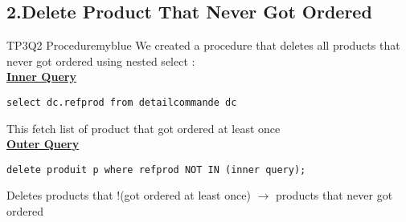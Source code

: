 \newpage
\subsection*{2.Delete Product That Never Got Ordered}


\begin{prettyBox}{TP3Q2 Procedure}{myblue}
We created a procedure that deletes all products that never got ordered using nested select :\\[0.15cm]
\textbf{\underline{Inner Query}}
\begin{lstlisting}
select dc.refprod from detailcommande dc
\end{lstlisting}
This fetch list of product that got ordered at least once\\[0.15cm]
\textbf{\underline{Outer Query}}
\begin{lstlisting}
delete produit p where refprod NOT IN (inner query); 
\end{lstlisting}
Deletes products that !(got ordered at least once) \(\rightarrow\) products that never got ordered
\end{prettyBox}
